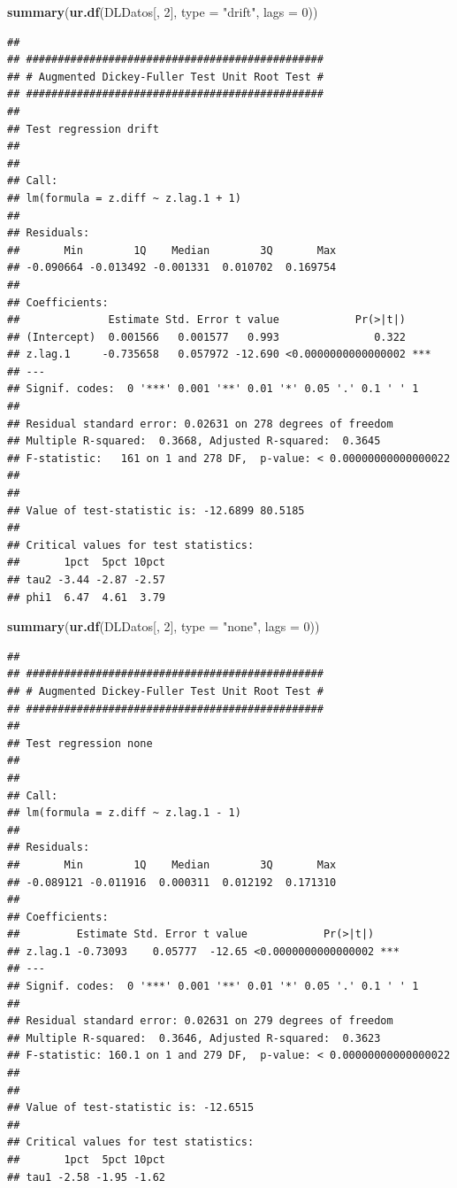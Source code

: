 \documentclass[
]{book}
\newenvironment{Shaded}{\begin{snugshade}}{\end{snugshade}}
\newcommand{\AttributeTok}[1]{\textcolor[rgb]{0.13,0.29,0.53}{#1}}
\newcommand{\DecValTok}[1]{\textcolor[rgb]{0.00,0.00,0.81}{#1}}
\newcommand{\FunctionTok}[1]{\textcolor[rgb]{0.13,0.29,0.53}{\textbf{#1}}}
\newcommand{\NormalTok}[1]{#1}
\newcommand{\StringTok}[1]{\textcolor[rgb]{0.31,0.60,0.02}{#1}}
\begin{document}
\begin{Shaded}
\begin{Highlighting}[]
\FunctionTok{summary}\NormalTok{(}\FunctionTok{ur.df}\NormalTok{(DLDatos[, }\DecValTok{2}\NormalTok{], }\AttributeTok{type =} \StringTok{"drift"}\NormalTok{, }\AttributeTok{lags =} \DecValTok{0}\NormalTok{))}
\end{Highlighting}
\end{Shaded}

\begin{verbatim}
## 
## ############################################### 
## # Augmented Dickey-Fuller Test Unit Root Test # 
## ############################################### 
## 
## Test regression drift 
## 
## 
## Call:
## lm(formula = z.diff ~ z.lag.1 + 1)
## 
## Residuals:
##       Min        1Q    Median        3Q       Max 
## -0.090664 -0.013492 -0.001331  0.010702  0.169754 
## 
## Coefficients:
##              Estimate Std. Error t value            Pr(>|t|)    
## (Intercept)  0.001566   0.001577   0.993               0.322    
## z.lag.1     -0.735658   0.057972 -12.690 <0.0000000000000002 ***
## ---
## Signif. codes:  0 '***' 0.001 '**' 0.01 '*' 0.05 '.' 0.1 ' ' 1
## 
## Residual standard error: 0.02631 on 278 degrees of freedom
## Multiple R-squared:  0.3668, Adjusted R-squared:  0.3645 
## F-statistic:   161 on 1 and 278 DF,  p-value: < 0.00000000000000022
## 
## 
## Value of test-statistic is: -12.6899 80.5185 
## 
## Critical values for test statistics: 
##       1pct  5pct 10pct
## tau2 -3.44 -2.87 -2.57
## phi1  6.47  4.61  3.79
\end{verbatim}

\begin{Shaded}
\begin{Highlighting}[]
\FunctionTok{summary}\NormalTok{(}\FunctionTok{ur.df}\NormalTok{(DLDatos[, }\DecValTok{2}\NormalTok{], }\AttributeTok{type =} \StringTok{"none"}\NormalTok{, }\AttributeTok{lags =} \DecValTok{0}\NormalTok{))}
\end{Highlighting}
\end{Shaded}

\begin{verbatim}
## 
## ############################################### 
## # Augmented Dickey-Fuller Test Unit Root Test # 
## ############################################### 
## 
## Test regression none 
## 
## 
## Call:
## lm(formula = z.diff ~ z.lag.1 - 1)
## 
## Residuals:
##       Min        1Q    Median        3Q       Max 
## -0.089121 -0.011916  0.000311  0.012192  0.171310 
## 
## Coefficients:
##         Estimate Std. Error t value            Pr(>|t|)    
## z.lag.1 -0.73093    0.05777  -12.65 <0.0000000000000002 ***
## ---
## Signif. codes:  0 '***' 0.001 '**' 0.01 '*' 0.05 '.' 0.1 ' ' 1
## 
## Residual standard error: 0.02631 on 279 degrees of freedom
## Multiple R-squared:  0.3646, Adjusted R-squared:  0.3623 
## F-statistic: 160.1 on 1 and 279 DF,  p-value: < 0.00000000000000022
## 
## 
## Value of test-statistic is: -12.6515 
## 
## Critical values for test statistics: 
##       1pct  5pct 10pct
## tau1 -2.58 -1.95 -1.62
\end{verbatim}
\end{document}

